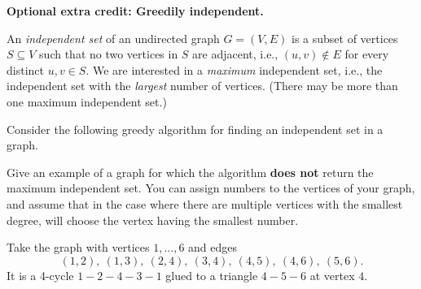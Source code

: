 \documentclass[11pt,addpoints,answers]{exam}
\begin{document}
\begin{questions}
\begin{parts}
  \end{parts}
  

  \bonusquestion \textbf{Optional extra credit: Greedily independent.} 

  
  \nopagebreak

  An \emph{independent set} of an undirected graph $G=(V,E)$ is a subset of vertices $S \subseteq V$ such that no two vertices in $S$ are adjacent, i.e., $(u,v) \notin E$ for every distinct $u,v \in S$.
  We are interested in a \emph{maximum} independent set, i.e., the independent set with the \emph{largest} number of vertices.
  (There may be more than one maximum independent set.)
    
  Consider the following greedy algorithm for finding an independent set in a graph.

  \begin{minipage}{\linewidth}
    \begin{algorithm}[H]
      \begin{algorithmic}[1]
        \EndWhile
        \EndFunction
      \end{algorithmic}
    \end{algorithm}
  \end{minipage}

  \begin{parts}

    \bonuspart[1]
    
    Give an example of a graph for which the algorithm  \textbf{does not} return the maximum independent set.
    You can assign numbers to the vertices of your graph, and assume that in the case where there are multiple vertices with the smallest degree,  will choose the vertex having the smallest number. 
    \begin{solution}
      Take the graph with vertices $1,\dots,6$ and edges
      \[
        (1,2),\ (1,3),\ (2,4),\ (3,4),\ (4,5),\ (4,6),\ (5,6).
      \]
      It is a 4-cycle $1\!-\!2\!-\!4\!-\!3\!-\!1$ glued to a triangle $4\!-\!5\!-\!6$ at vertex $4$.

      \begin{center}
      \end{center}


\end{solution}
\end{parts}
\end{questions}
\end{document}
